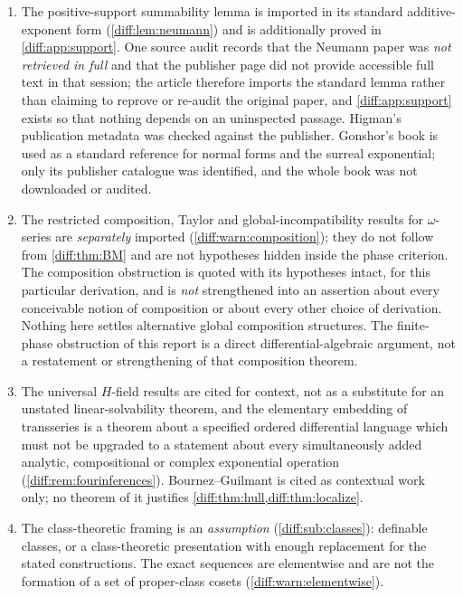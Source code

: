 \documentclass[11pt,letterpaper]{article}
\numberwithin{equation}{section}
\theoremstyle{definition}
\theoremstyle{remark}
\begin{document}
\begin{enumerate}[label=\textup{N\arabic*.},leftmargin=3.0em,itemsep=0.35em]
(\cref{diff:lem:smallnegative}), and is therefore not advertised as part of
the imported theorem. Two of the source manuscripts instead import it, one of
them flagging it as specific to the chosen derivation and not a general fact
about derivations of non-Archimedean fields; that route is recorded in
\cref{diff:rem:sqrtsmallness}. Either way, smallness is a structural
hypothesis about this derivation.
\item The positive-support summability lemma is imported in its standard
additive-exponent form (\cref{diff:lem:neumann}) and is additionally proved in
\cref{diff:app:support}. One source audit records that the Neumann paper was
\emph{not retrieved in full} and that the publisher page did not provide
accessible full text in that session; the article therefore imports the
standard lemma rather than claiming to reprove or re-audit the original paper,
and \cref{diff:app:support} exists so that nothing depends on an uninspected
passage. Higman's publication metadata was checked against the publisher.
Gonshor's book is used as a standard reference for normal forms and the
surreal exponential; only its publisher catalogue was identified, and the
whole book was not downloaded or audited.
\item The restricted composition, Taylor and global-incompatibility results
for $\omega$-series are \emph{separately} imported
(\cref{diff:warn:composition}); they do not follow from \cref{diff:thm:BM} and
are not hypotheses hidden inside the phase criterion. The composition
obstruction is quoted with its hypotheses intact, for this particular
derivation, and is \emph{not} strengthened into an assertion about every
conceivable notion of composition or about every other choice of derivation.
Nothing here settles alternative global composition structures. The
finite-phase obstruction of this report is a direct differential-algebraic
argument, not a restatement or strengthening of that composition theorem.
\item The universal $H$-field results are cited for context, not as a
substitute for an unstated linear-solvability theorem, and the elementary
embedding of transseries is a theorem about a specified ordered differential
language which must not be upgraded to a statement about every simultaneously
added analytic, compositional or complex exponential operation
(\cref{diff:rem:fourinferences}). Bournez--Guilmant is cited as contextual
work only; no theorem of it justifies
\cref{diff:thm:hull,diff:thm:localize}.
\item The class-theoretic framing is an \emph{assumption}
(\cref{diff:sub:classes}): definable classes, or a class-theoretic
presentation with enough replacement for the stated constructions. The exact
sequences are elementwise and are not the formation of a set of proper-class
cosets (\cref{diff:warn:elementwise}).
\end{enumerate}
\end{document}
